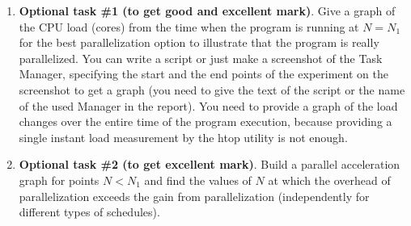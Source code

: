 {\begin{enumerate}
		\item\textbf{Optional task \#1 (to get good and excellent mark)}. Give a graph of the CPU load (cores) from the time when the program is running at $N=N_1$ for the best parallelization option to illustrate that the program is really parallelized. You can write a script or just make a screenshot of the Task Manager, specifying the start and the end points of the experiment on the screenshot to get a graph (you need to give the text of the script or the name of the used Manager in the report). You need to provide a graph of the load changes over the entire time of the program execution, because providing a single instant load measurement by the htop utility is not enough.
		\item\textbf{Optional task \#2 (to get excellent mark)}. Build a parallel acceleration graph for points $N<N_1$ and find the values of $N$ at which the overhead of parallelization exceeds the gain from parallelization (independently for different types of schedules).
	\end{enumerate}
}